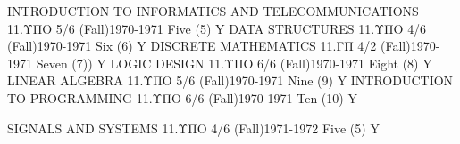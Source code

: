 \begin{grades}
    \begin{acadyear}[1970-1971]
            {INTRODUCTION TO INFORMATICS AND TELECOMMUNICATIONS}
            {11.ΥΠΟ}
            {5/6}
            {(Fall)1970-1971}
            {Five (5)}
            {Y}
            {DATA STRUCTURES}
            {11.ΥΠΟ}
            {4/6}
            {(Fall)1970-1971}
            {Six (6)}
            {Y}
            {DISCRETE MATHEMATICS}
            {11.ΓΠ}
            {4/2}
            {(Fall)1970-1971}
            {Seven (7))}
            {Y}
            {LOGIC DESIGN}
            {11.ΥΠΟ}
            {6/6}
            {(Fall)1970-1971}
            {Eight (8)}
            {Y}
            {LINEAR ALGEBRA}
            {11.ΥΠΟ}
            {5/6}
            {(Fall)1970-1971}
            {Nine (9)}
            {Y}
            {INTRODUCTION TO PROGRAMMING}
            {11.ΥΠΟ}
            {6/6}
            {(Fall)1970-1971}
            {Ten (10)}
            {Y}
    \end{acadyear}
    \clearpage
    \begin{acadyear}[1971-1972]
            {SIGNALS AND SYSTEMS}
            {11.ΥΠΟ}
            {4/6}
            {(Fall)1971-1972}
            {Five (5)}
            {Y}
    \end{acadyear}
\end{grades}

